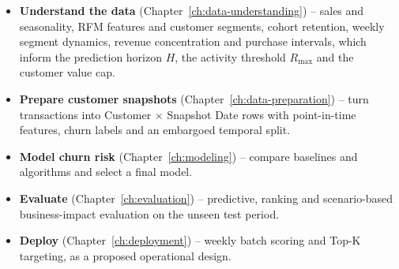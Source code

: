 \begin{itemize}
    \item \textbf{Understand the data} (Chapter~\ref{ch:data-understanding}) -- sales and seasonality, RFM features and customer segments, cohort retention, weekly segment dynamics, revenue concentration and purchase intervals, which inform the prediction horizon $H$, the activity threshold $R_{\max}$ and the customer value cap.
    \item \textbf{Prepare customer snapshots} (Chapter~\ref{ch:data-preparation}) -- turn transactions into Customer $\times$ Snapshot Date rows with point-in-time features, churn labels and an embargoed temporal split.
    \item \textbf{Model churn risk} (Chapter~\ref{ch:modeling}) -- compare baselines and algorithms and select a final model.
    \item \textbf{Evaluate} (Chapter~\ref{ch:evaluation}) -- predictive, ranking and scenario-based business-impact evaluation on the unseen test period.
    \item \textbf{Deploy} (Chapter~\ref{ch:deployment}) -- weekly batch scoring and Top-K targeting, as a proposed operational design.
\end{itemize}
